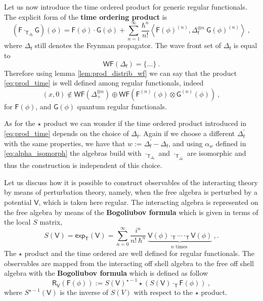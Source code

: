 \documentclass[11pt]{book}
\newcommand{\hilight}[1]{\colorbox{yellow!80!black}{#1}}
\newcommand{\WF}{\mathsf{WF}}
\renewcommand{\exp}{\mathsf{exp}}
\newcommand{\sm}[1]{\left\langle#1\right\rangle}
\newcommand{\Fsf}{\mathsf{F}}
\newcommand{\Gsf}{\mathsf{G}}
\newcommand{\Rsf}{\mathsf{R}}
\newcommand{\Tsf}{\mathsf{T}}
\newcommand{\Vsf}{\mathsf{V}}
\newcommand{\fsf}{\mathsf{f}}
\theoremstyle{break}
\begin{document}
Let us now introduce the time ordered product for generic regular functionals. The explicit form of the \textbf{time ordering product} is
%
\begin{equation}
(\Fsf \cdot_{\Tsf_{\Delta_\fsf}}  \Gsf)(\phi) = \Fsf(\phi) \cdot \Gsf(\phi) + \sum_{n=1}^\infty \frac{\hbar^n}{n!} \sm{ \Fsf(\phi)^{(n)} , \Delta_\fsf^{\otimes n} \ \Gsf(\phi)^{(n)} } \ ,
\label{eq:prod_time}
\end{equation}
%
where $\Delta_\fsf$ still denotes the Feynman propagator. The \hilight{wave front set of $\Delta_\fsf$} is equal to
%
\begin{equation}
\WF(\Delta_\fsf) = \bigg\{ ... \bigg\} \ . 
\end{equation}
%
Therefore using lemma \ref{lem:prod_distrib_wf} we can say that the product \eqref{eq:prod_time} is well defined among regular functionals, indeed
%
\begin{equation*}
(x,0) \notin \WF(\Delta_+^{\otimes n}) \oplus \WF\left(\Fsf^{(n)}(\phi) \otimes \Gsf^{(n)}(\phi)\right) \ ,
\end{equation*}
%
for $\Fsf(\phi)$, and $\Gsf(\phi)$ quantum regular functionals. 


\bigskip


As for the $\star$ product we can wonder if the time ordered product introduced in \eqref{eq:prod_time} depends on the choice of $\Delta_\fsf$. Again if we choose a different $\Delta^\prime_\fsf$ with the same properties, we have that $w:=\Delta^\prime_\fsf - \Delta_\fsf$, and using $\alpha_{w}$ defined in \eqref{eq:alpha_isomorph} the algebras build with $\cdot_{\Tsf_{\Delta_\fsf}}$ and $\cdot_{\Tsf_{\Delta^\prime_\fsf}}$ are isomorphic and thus the construction is independent of this choice.


\bigskip


Let us discuss how it is possible to construct observables of the interacting theory by means of perturbation theory, namely, when the free algebra is perturbed by a potential $\Vsf$, which is taken here regular. The interacting algebra is represented on the free algebra by means of the \textbf{Bogoliubov formula} which is given in terms of the local $S$ matrix, 
%
\begin{equation}
S(\Vsf) = \exp_\Tsf\left(\Vsf\right) = \sum^\infty_{n=0} \frac{i^n}{n!\ \hbar^n} \ \underbrace{\Vsf(\phi) \cdot_\Tsf \cdots \cdot_\Tsf \Vsf(\phi)}_{n \mbox{ times }} \ ,.
\label{eq:S_matrix}
\end{equation}
%
The $\star$ product and the time ordered are well defined for regular functionals. The observables are mapped from the interacting off shell algebra to the free off shell algebra with the \textbf{Bogoliubov formula} \cite{duetsch_causal_2004} which is defined as follow
%
\begin{equation}
\Rsf_\Vsf(\Fsf(\phi)) := S(\Vsf)^{\star-1} \star \left( S(\Vsf) \cdot_\Tsf \Fsf(\phi) \right) \ ,
\label{eq:bogoliubov}
\end{equation}
%
where $S^{\star-1}(\Vsf)$ is the inverse of $S(V)$ with respect to the $\star$ product. 
\end{document}
